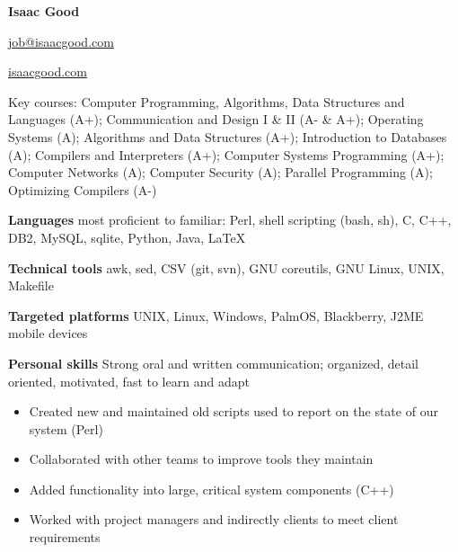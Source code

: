 \documentclass{article}
\begin{document}
  \begin{multicols}{2}
    \begin{flushleft}
      \textbf{ \huge Isaac Good }
    \end{flushleft}
    \begin{flushright}
      \href{mailto:job@isaacgood.com}{job@isaacgood.com}

      \href{http://www.isaacgood.com/}{isaacgood.com}
    \end{flushright}
  \end{multicols}


    \small Key courses: Computer Programming, Algorithms, Data Structures and Languages (A+); Communication and Design I \& II (A- \& A+); Operating Systems (A); Algorithms and Data Structures (A+); Introduction to Databases (A); Compilers and Interpreters (A+); Computer Systems Programming (A+); Computer Networks (A); Computer Security (A); Parallel Programming (A); Optimizing Compilers (A-)

    \textbf{Languages} {\small most proficient to familiar}: Perl, shell scripting (bash, sh), C, C++, DB2, MySQL, sqlite, Python, Java, \LaTeX

    \textbf{Technical tools} awk, sed, CSV (git, svn), GNU coreutils, GNU Linux, UNIX, Makefile

    \textbf{Targeted platforms} UNIX, Linux, Windows, PalmOS, Blackberry, J2ME mobile devices

    \textbf{Personal skills} Strong oral and written communication; organized, detail oriented, motivated, fast to learn and adapt


      \begin{itemize}
        \item Created new and maintained old scripts used to report on the state of our system (Perl)
        \item Collaborated with other teams to improve tools they maintain
        \item Added functionality into large, critical system components (C++)
        \item Worked with project managers and indirectly clients to meet client requirements
      \end{itemize}
\end{document}
